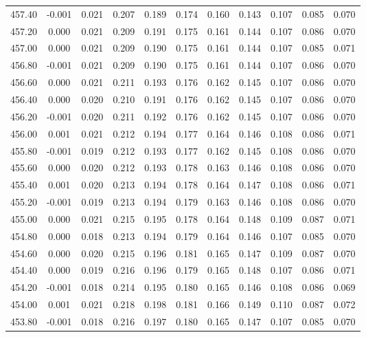 \begin{longtable}{cccccccccc}
    457.40 & -0.001 &  0.021 &  0.207 &  0.189 &  0.174 &  0.160 &  0.143 &  0.107 &  0.085 &  0.070 \\
    457.20 &  0.000 &  0.021 &  0.209 &  0.191 &  0.175 &  0.161 &  0.144 &  0.107 &  0.086 &  0.070 \\
    457.00 &  0.000 &  0.021 &  0.209 &  0.190 &  0.175 &  0.161 &  0.144 &  0.107 &  0.085 &  0.071 \\
    456.80 & -0.001 &  0.021 &  0.209 &  0.190 &  0.175 &  0.161 &  0.144 &  0.107 &  0.086 &  0.070 \\
    456.60 &  0.000 &  0.021 &  0.211 &  0.193 &  0.176 &  0.162 &  0.145 &  0.107 &  0.086 &  0.070 \\
    456.40 &  0.000 &  0.020 &  0.210 &  0.191 &  0.176 &  0.162 &  0.145 &  0.107 &  0.086 &  0.070 \\
    456.20 & -0.001 &  0.020 &  0.211 &  0.192 &  0.176 &  0.162 &  0.145 &  0.107 &  0.086 &  0.070 \\
    456.00 &  0.001 &  0.021 &  0.212 &  0.194 &  0.177 &  0.164 &  0.146 &  0.108 &  0.086 &  0.071 \\
    455.80 & -0.001 &  0.019 &  0.212 &  0.193 &  0.177 &  0.162 &  0.145 &  0.108 &  0.086 &  0.070 \\
    455.60 &  0.000 &  0.020 &  0.212 &  0.193 &  0.178 &  0.163 &  0.146 &  0.108 &  0.086 &  0.070 \\
    455.40 &  0.001 &  0.020 &  0.213 &  0.194 &  0.178 &  0.164 &  0.147 &  0.108 &  0.086 &  0.071 \\
    455.20 & -0.001 &  0.019 &  0.213 &  0.194 &  0.179 &  0.163 &  0.146 &  0.108 &  0.086 &  0.070 \\
    455.00 &  0.000 &  0.021 &  0.215 &  0.195 &  0.178 &  0.164 &  0.148 &  0.109 &  0.087 &  0.071 \\
    454.80 &  0.000 &  0.018 &  0.213 &  0.194 &  0.179 &  0.164 &  0.146 &  0.107 &  0.085 &  0.070 \\
    454.60 &  0.000 &  0.020 &  0.215 &  0.196 &  0.181 &  0.165 &  0.147 &  0.109 &  0.087 &  0.070 \\
    454.40 &  0.000 &  0.019 &  0.216 &  0.196 &  0.179 &  0.165 &  0.148 &  0.107 &  0.086 &  0.071 \\
    454.20 & -0.001 &  0.018 &  0.214 &  0.195 &  0.180 &  0.165 &  0.146 &  0.108 &  0.086 &  0.069 \\
    454.00 &  0.001 &  0.021 &  0.218 &  0.198 &  0.181 &  0.166 &  0.149 &  0.110 &  0.087 &  0.072 \\
    453.80 & -0.001 &  0.018 &  0.216 &  0.197 &  0.180 &  0.165 &  0.147 &  0.107 &  0.085 &  0.070 \\

\end{longtable}
